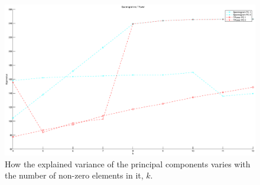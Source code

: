 \documentclass[11pt,a4paper]{article}
\begin{document}
\begin{figure}[H]
\centering
\includegraphics[scale=0.3]{Spannogram_vs_TPower_k.eps}
\caption{How the explained variance of the principal components varies with the number of non-zero elements in it, $k$.}
\label{explained_var_graph}
\end{figure}

\end{document}
